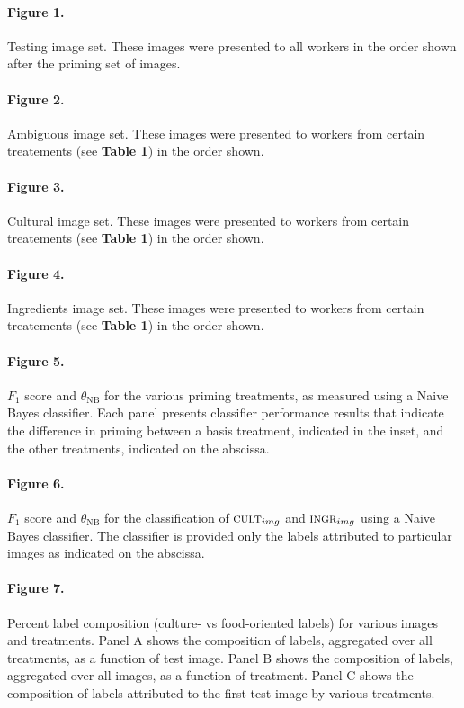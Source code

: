 \documentclass[a4paper]{report}
\begin{document}
\paragraph{Figure 1.}
	Testing image set. These images were presented to all workers in the order 
	shown after the priming set of images. 

\paragraph{Figure 2.}
	Ambiguous image set. These images were presented to workers from certain
	treatements (see \textbf{Table 1}) in the order shown.  

\paragraph{Figure 3.}
	Cultural image set. These images were presented to workers from certain
	treatements (see \textbf{Table 1}) in the order shown.  

\paragraph{Figure 4.}
	Ingredients image set. These images were presented to workers from certain
	treatements (see \textbf{Table 1}) in the order shown.  

\paragraph{Figure 5.}
$F_1$ score and $\theta_\text{NB}$ for the various 
priming treatments, as measured using a Naive Bayes classifier. Each panel 
presents classifier performance results that indicate the difference in
priming between a basis 
treatment, indicated in the inset, and the other treatments, indicated on the
abscissa.

\paragraph{Figure 6.}
$F_1$ score and $\theta_\text{NB}$ for the classification of 
$\textsc{cult}_{img}$ and $\textsc{ingr}_{img}$ using a Naive Bayes 
classifier.  The classifier is provided only the labels attributed to
particular images as indicated on the abscissa.

\paragraph{Figure 7.}
Percent label composition (culture- vs food-oriented labels) for 
various images and treatments.  Panel A shows the composition of 
labels, aggregated over all treatments, as a function of test image.
Panel B shows the composition of labels, aggregated over all images, as
a function of treatment.  Panel C shows the composition of labels 
attributed to the first test image by various treatments.
\end{document}
